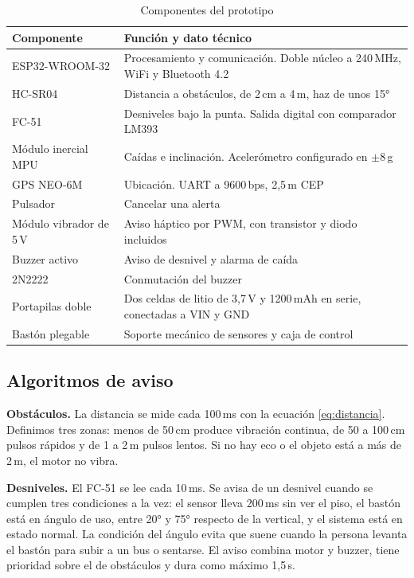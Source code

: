 \documentclass[conference,a4paper]{IEEEtran}
\begin{document}
\begin{table}[!t]
\caption{Componentes del prototipo}
\label{tab:componentes}
\centering
\footnotesize
\renewcommand{\arraystretch}{1.12}
\begin{tabular}{>{\raggedright\arraybackslash}p{2.7cm} >{\raggedright\arraybackslash}p{5.1cm}}
\toprule
\textbf{Componente} & \textbf{Función y dato técnico} \\
\midrule
ESP32-WROOM-32 & Procesamiento y comunicación. Doble núcleo a 240\,MHz, WiFi y Bluetooth 4.2 \cite{esp32} \\
HC-SR04 & Distancia a obstáculos, de 2\,cm a 4\,m, haz de unos 15° \\
FC-51 & Desniveles bajo la punta. Salida digital con comparador LM393 \\
Módulo inercial MPU & Caídas e inclinación. Acelerómetro configurado en $\pm$8\,g \cite{mpu6050} \\
GPS NEO-6M & Ubicación. UART a 9600\,bps, 2,5\,m CEP \cite{neo6m} \\
Pulsador & Cancelar una alerta \\
Módulo vibrador de 5\,V & Aviso háptico por PWM, con transistor y diodo incluidos \\
Buzzer activo & Aviso de desnivel y alarma de caída \\
2N2222 & Conmutación del buzzer \\
Portapilas doble & Dos celdas de litio de 3,7\,V y 1200\,mAh en serie, conectadas a VIN y GND \\
Bastón plegable & Soporte mecánico de sensores y caja de control \\
\bottomrule
\end{tabular}
\end{table}

\subsection{Algoritmos de aviso}

\textbf{Obstáculos.} La distancia se mide cada 100\,ms con la ecuación \eqref{eq:distancia}. Definimos tres zonas: menos de 50\,cm produce vibración continua, de 50 a 100\,cm pulsos rápidos y de 1 a 2\,m pulsos lentos. Si no hay eco o el objeto está a más de 2\,m, el motor no vibra.

\textbf{Desniveles.} El FC-51 se lee cada 10\,ms. Se avisa de un desnivel cuando se cumplen tres condiciones a la vez: el sensor lleva 200\,ms sin ver el piso, el bastón está en ángulo de uso, entre 20° y 75° respecto de la vertical, y el sistema está en estado normal. La condición del ángulo evita que suene cuando la persona levanta el bastón para subir a un bus o sentarse. El aviso combina motor y buzzer, tiene prioridad sobre el de obstáculos y dura como máximo 1,5\,s.
\end{document}
